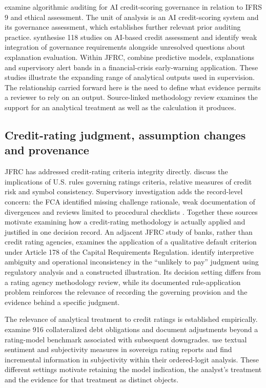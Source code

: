 \documentclass[11pt,a4paper]{article}
\begin{document}
\citet{benamor2026} examine algorithmic auditing for AI credit-scoring governance in relation to IFRS 9 and ethical assessment. The unit of analysis is an AI credit-scoring system and its governance assessment, which establishes further relevant prior auditing practice. \citet{bahadori2026} synthesise 118 studies on AI-based credit assessment and identify weak integration of governance requirements alongside unresolved questions about explanation evaluation. Within JFRC, \citet{mustafa2026} combine predictive models, explanations and supervisory alert bands in a financial-crisis early-warning application. These studies illustrate the expanding range of analytical outputs used in supervision. The relationship carried forward here is the need to define what evidence permits a reviewer to rely on an output. Source-linked methodology review examines the support for an analytical treatment as well as the calculation it produces.

\subsection{Credit-rating judgment, assumption changes and provenance}

JFRC has addressed credit-rating criteria integrity directly. \citet{adelson2015} discuss the implications of U.S. rules governing ratings criteria, relative measures of credit risk and symbol consistency. Supervisory investigation adds the record-level concern: the FCA identified missing challenge rationale, weak documentation of divergences and reviews limited to procedural checklists \citep{fca2026}. Together these sources motivate examining how a credit-rating methodology is actually applied and justified in one decision record. An adjacent JFRC study of banks, rather than credit rating agencies, examines the application of a qualitative default criterion under Article 178 of the Capital Requirements Regulation. \citet{kar2026} identify interpretive ambiguity and operational inconsistency in the ``unlikely to pay'' judgment using regulatory analysis and a constructed illustration. Its decision setting differs from a rating agency methodology review, while its documented rule-application problem reinforces the relevance of recording the governing provision and the evidence behind a specific judgment. 

The relevance of analytical treatment to credit ratings is established empirically. \citet{griffin2012} examine 916 collateralized debt obligations and document adjustments beyond a rating-model benchmark associated with subsequent downgrades. \citet{slapnik2023} use textual sentiment and subjectivity measures in sovereign rating reports and find incremental information in subjectivity within their ordered-logit analysis. These different settings motivate retaining the model indication, the analyst's treatment and the evidence for that treatment as distinct objects.
\end{document}
